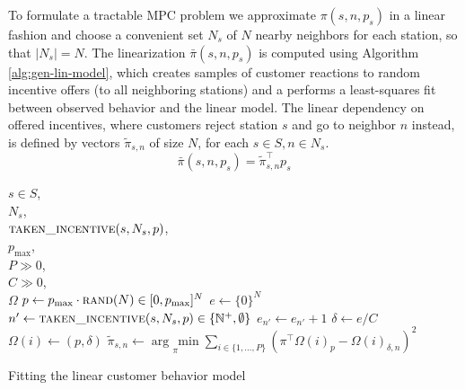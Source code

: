 \documentclass{article}
\begin{document}
To formulate a tractable MPC problem we approximate $\pi(s,n,p_s)$ in a linear
fashion and choose a convenient set $N_s$ of $N$ nearby neighbors for each
station, so that $|N_s| = N$. The linearization $\bar \pi(s,n,p_s)$ is computed
using Algorithm \ref{alg:gen-lin-model}, which creates samples of customer
reactions to random incentive offers (to all neighboring stations) and a
performs a least-squares fit between observed behavior and the linear model. The
linear dependency on offered incentives, where customers reject station $s$ and
go to neighbor $n$ instead, is defined by vectors $\tilde{\pi}_{s,n}$ of size
$N$, for each $s\in S, n\in N_s$.
\begin{equation}
 \bar \pi(s,n,p_s) = \tilde \pi_{s,n}^\top p_s
\end{equation}
\begin{algorithm}
  \begin{algorithmic}[1]
    \Require $s \in S$,\\
    $N_s$, \\
    $\Call{taken\_incentive}{s,N_s,p}$, \\
    $p_{\max}$, \\
    $P \gg 0$, \\
    $C \gg 0$, \\
    $\Omega$   \State $p
    \leftarrow p_{\max} \cdot \Call{rand}{N} \in [0, p_{\max}]^N$ 
    \State $e \leftarrow \{0\}^N$  
    \State $n' \leftarrow \Call{taken\_incentive}{s,N_s,p} \in\{\mathbb N^+,\emptyset\}$
    \State $e_{n'} \leftarrow e_{n'} + 1$
    \EndFor
    \State $\delta \leftarrow e/C$ 
    \State $\Omega(i) \leftarrow (p, \delta)$
    \EndFor
    \State $\tilde{\pi}_{s,n} \leftarrow \underset{\pi}{\arg\,\min}
      \sum_{i\in\{1,\ldots, P\}}\left(\pi^\top \Omega(i)_{p} -
        \Omega(i)_{\delta,n}\right)^2$
    \EndFor
  \end{algorithmic}
  \caption{Fitting the linear customer behavior model}
  \label{alg:gen-lin-model}
\end{algorithm}
\end{document}
